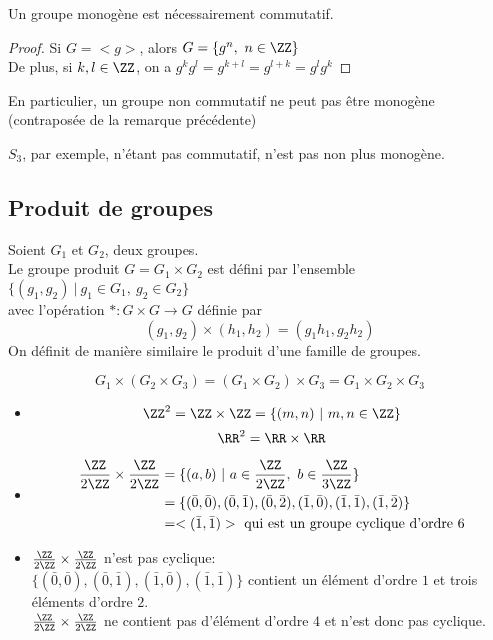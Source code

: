 \documentclass[../main.tex]{subfile}
\begin{document}
\begin{rema}
	Un groupe monogène est nécessairement commutatif.
\end{rema}

\begin{proof}
	Si $G = <g>$, alors $G = \{g^n, \ n \in \ZZ\}$\\
	De plus, si $k, l \in \ZZ$, on a $g^kg^l = g^{k+l} = g^{l+k} = g^lg^k$
\end{proof}

\begin{rema}
	En particulier, un groupe non commutatif ne peut pas être monogène (contraposée de la remarque précédente)
\begin{ex}	
	$S_3$, par exemple, n'étant pas commutatif, n'est pas non plus monogène.
\end{ex}
\end{rema}

\subsection{Produit de groupes}

Soient $G_1$ et $G_2$, deux groupes.\\
Le groupe produit $G = G_1 \times G_2$ est défini par l'ensemble $\{(g_1, g_2) \ | \ g_1 \in G_1,\ g_2 \in G_2\}$\\
avec l'opération $* : G \times G \to G$ définie par 
$$(g_1, g_2) \times (h_1, h_2) = (g_1h_1, g_2h_2)$$
On définit de manière similaire le produit d'une famille de groupes.\\

\begin{rema}
	$$G_1 \times (G_2 \times G_3) = (G_1 \times G_2) \times G_3 = G_1 \times G_2 \times G_3$$
\end{rema}

\begin{ex}
\begin{itemize}	
	\item $$\ZZ^2 = \ZZ \times \ZZ = \{(m, n) \ | \ m, n \in \ZZ\}$$
	$$\RR^2 = \RR \times \RR$$

	\item
	$$
\begin{aligned}	
	\frac{\ZZ}{2\ZZ} \times \frac{\ZZ}{2\ZZ} &= \{(a, b) \ | \ a \in \frac{\ZZ}{2\ZZ} , \ b \in \frac{\ZZ}{3\ZZ}\}\\
	&= \{(\bar{0}, \bar{0}), (\bar{0}, \bar{1}), (\bar{0}, \bar{2}), (\bar{1}, \bar{0}), (\bar{1}, \bar{1}), (\bar{1}, \bar{2})\}\\
	&= <(\bar{1}, \bar{1})> \ \text{qui est un groupe cyclique d'ordre 6}
\end{aligned}
	$$

	\item $\frac{\ZZ}{2\ZZ} \times \frac{\ZZ}{2\ZZ}$ n'est pas cyclique:\\
	$\{(\bar{0}, \bar{0}), (\bar{0}, \bar{1}), (\bar{1}, \bar{0}), (\bar{1}, \bar{1})\}$ contient un élément d'ordre $1$ et trois éléments d'ordre $2$.\\
	$\frac{\ZZ}{2\ZZ} \times \frac{\ZZ}{2\ZZ}$ ne contient pas d'élément d'ordre $4$ et n'est donc pas cyclique.
\end{itemize}
\end{ex}
\end{document}
